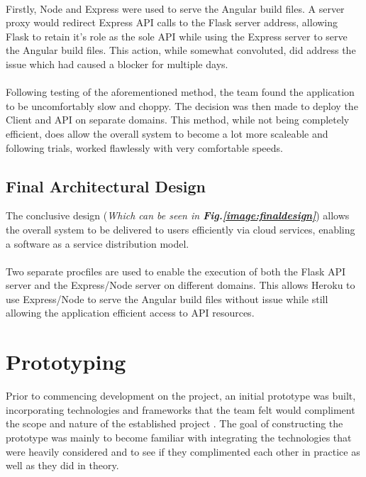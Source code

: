 \paragraph{}
Firstly, Node and Express were used to serve the Angular build files. A server proxy would redirect Express API calls to the Flask server address, allowing Flask to retain it's role as the sole API while using the Express server to serve the Angular build files. This action, while somewhat convoluted, did address the issue which had caused a blocker for multiple days.

\paragraph{}
Following testing of the aforementioned method, the team found the application to be uncomfortably slow and choppy. The decision was then made to deploy the Client and API on separate domains. This method, while not being completely efficient, does allow the overall system to become a lot more scaleable and following trials, worked flawlessly with very comfortable speeds. 

\subsection{Final Architectural Design}
The conclusive design (\textit{Which can be seen in \textbf{Fig.\ref{image:finaldesign}}}) allows the overall system to be delivered to users efficiently via cloud services, enabling a software as a service distribution model. 

\paragraph{}
Two separate procfiles are used to enable the execution of both the Flask API server and the Express/Node server on different domains. This allows Heroku to use Express/Node to serve the Angular build files without issue while still allowing the application efficient access to API resources.

\section{Prototyping}
Prior to commencing development on the project, an initial prototype was built, incorporating technologies and frameworks that the team felt would compliment the scope and nature of the established project \cite{PROTOTYPE_HEROKU}. The goal of constructing the prototype was mainly to become familiar with integrating the technologies that were heavily considered and to see if they complimented each other in practice as well as they did in theory.


